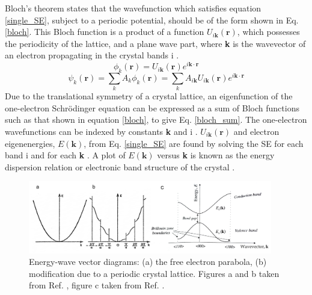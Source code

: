 \documentclass[11pt, twoside]{report}
\begin{document}

Bloch's theorem states that the wavefunction which satisfies equation \ref{single_SE}, subject to a periodic potential, should be of the form shown in Eq. \ref{bloch}. This Bloch function is a product of a function $U_{i\mathbf{k}}(\mathbf{r})$, which possesses the periodicity of the lattice, and a plane wave part, where \textbf{k} is the wavevector of an electron propagating in the crystal bands i \cite{Nelson3}.
\begin{equation} \label{bloch}
\phi_k(\mathbf{r}) = U_{i\mathbf{k}}(\mathbf{r}) e^{i\mathbf{k \cdot r}} 
\end{equation}
\begin{equation} \label{bloch_sum}
\psi_k(\mathbf{r}) = \sum_k A_k \phi_k(\mathbf{r}) = \sum_k A_{i\mathbf{k}}U_{i\mathbf{k}}(\mathbf{r}) e^{i\mathbf{k \cdot r}} 
\end{equation}
Due to the translational symmetry of a crystal lattice, an eigenfunction of the one-electron Schr{\"o}dinger equation can be expressed as a sum of Bloch functions such as that shown in equation \ref{bloch}, to give Eq. \ref{bloch_sum}. The one-electron wavefunctions can be indexed by constants \textbf{k} and i \cite{fund_semi}. 
$U_{i\mathbf{k}}(\mathbf{r})$ and electron eigenenergies, $E(\mathbf{k})$, from Eq. \ref{single_SE} are found by solving the SE for each band i and for each \textbf{k} \cite{Nelson3}.
A plot of $E(\textbf{k})$ versus \textbf{k} is known as the energy dispersion relation or electronic band structure of the crystal \cite{fund_semi}.
\begin{figure}[h!]
  \centering
    \includegraphics[width=0.95\textwidth]{figures/bs1_2.png}
    \caption{Energy-wave vector diagrams: (a) the free electron parabola, (b) modification due to a periodic crystal lattice. Figures a and b taken from Ref. , figure c taken from Ref. .}
  \label{bs1}
\end{figure}
\end{document}
